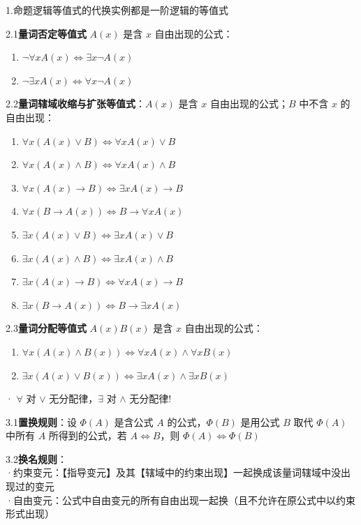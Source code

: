 1.命题逻辑等值式的代换实例都是一阶逻辑的等值式

2.1\textbf{量词否定等值式} $A(x)$ 是含 $x$ 自由出现的公式：
\begin{enumerate}
	\item $\neg \forall x A(x)  \Leftrightarrow \exists x \neg A(x)$
	\item $\neg \exists x A(x)  \Leftrightarrow \forall x \neg A(x)$
\end{enumerate}

2.2\textbf{量词辖域收缩与扩张等值式}：$A(x)$ 是含 $x$ 自由出现的公式；$B$ 中不含 $x$ 的自由出现：
\begin{enumerate}
	\item$\forall x (A(x) \vee B) \Leftrightarrow \forall x A(x) \vee B$
	\item$\forall x (A(x) \land B) \Leftrightarrow \forall x A(x) \land B$
	\item$\forall x (A(x) \rightarrow B) \Leftrightarrow \exists x A(x) \rightarrow B$
	\item$\forall x (B \rightarrow A(x)) \Leftrightarrow B \rightarrow \forall x A(x)$

	\item$\exists x (A(x) \vee B) \Leftrightarrow \exists x A(x) \vee B$
	\item$\exists x (A(x) \land B) \Leftrightarrow \exists x A(x) \land B$
	\item$\exists x (A(x) \rightarrow B) \Leftrightarrow \forall x A(x) \rightarrow B$
	\item$\exists x (B \rightarrow A(x)) \Leftrightarrow B \rightarrow \exists x A(x)$
\end{enumerate}

2.3\textbf{量词分配等值式} $A(x)B(x)$ 是含 $x$ 自由出现的公式：
\begin{enumerate}
	\item $\forall x (A(x) \land B(x))  \Leftrightarrow \forall x A(x) \land \forall x B(x)$
	\item $\exists x (A(x) \lor B(x))  \Leftrightarrow \exists x A(x) \land \exists x B(x)$
\end{enumerate}

· $\forall$ 对 $\vee$ 无分配律，$\exists$ 对 $\land$ 无分配律!

3.1\textbf{置换规则}：设 $\Phi(A)$ 是含公式 $A$ 的公式，$\Phi(B)$ 是用公式 $B$ 取代 $\Phi(A)$ 中所有 $A$ 所得到的公式，若 $A  \Leftrightarrow B$，则 $\Phi(A)  \Leftrightarrow \Phi(B)$

3.2\textbf{换名规则}：\\
·约束变元：【指导变元】及其【辖域中的约束出现】一起换成该量词辖域中没出现过的变元\\
·自由变元：公式中自由变元的所有自由出现一起换（且不允许在原公式中以约束形式出现）

